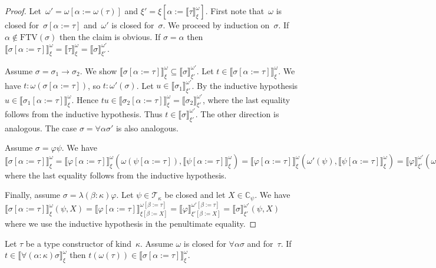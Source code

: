 \documentclass[a4paper,UKenglish,cleveref,autoref,numberwithinsect]{lipics-v2019}
\theoremstyle{definition}
\newcommand{\arrtype}{\rightarrow}
\newcommand{\subst}[2]{#1:=#2}
\newcommand{\FTV}{\mathrm{FTV}}
\newcommand{\Tc}{\mathcal{T}}
\newcommand{\Cb}{\mathbb{C}}
\newcommand{\val}[3]{\ensuremath{\llbracket#1\rrbracket_{#2}^{#3}}}
\begin{document}
\begin{proof}
  Let~$\omega' = \omega[\subst{\alpha}{\omega(\tau)}]$ and $\xi' =
  \xi[\subst{\alpha}{\val{\tau}{\xi}{\omega}}]$. First note
  that~$\omega$ is closed for~$\sigma[\subst{\alpha}{\tau}]$
  and~$\omega'$ is closed for~$\sigma$. We proceed by induction
  on~$\sigma$. If $\alpha \notin \FTV(\sigma)$ then the claim is
  obvious. If $\sigma = \alpha$ then
  $\val{\sigma[\subst{\alpha}{\tau}]}{\xi}{\omega} =
  \val{\tau}{\xi}{\omega} = \val{\sigma}{\xi'}{\omega'}$.

  Assume $\sigma = \sigma_1\arrtype\sigma_2$. We show
  $\val{\sigma[\subst{\alpha}{\tau}]}{\xi}{\omega} \subseteq
  \val{\sigma}{\xi'}{\omega'}$. Let $t \in
  \val{\sigma[\subst{\alpha}{\tau}]}{\xi}{\omega}$. We have $t :
  \omega(\sigma[\subst{\alpha}{\tau}])$, so $t : \omega'(\sigma)$. Let
  $u \in \val{\sigma_1}{\xi'}{\omega'}$. By the inductive hypothesis
  $u \in \val{\sigma_1[\subst{\alpha}{\tau}]}{\xi}{\omega}$. Hence $t
  u \in \val{\sigma_2[\subst{\alpha}{\tau}]}{\xi}{\omega} =
  \val{\sigma_2}{\xi'}{\omega'}$, where the last equality follows from
  the inductive hypothesis. Thus $t \in
  \val{\sigma}{\xi'}{\omega'}$. The other direction is analogous. The
  case $\sigma = \forall\alpha\sigma'$ is also analogous.

  Assume $\sigma = \varphi\psi$. We have
  $\val{\sigma[\subst{\alpha}{\tau}]}{\xi}{\omega} =
  \val{\varphi[\subst{\alpha}{\tau}]}{\xi}{\omega}(\omega(\psi[\subst{\alpha}{\tau}]),
  \val{\psi[\subst{\alpha}{\tau}]}{\xi}{\omega}) =
  \val{\varphi[\subst{\alpha}{\tau}]}{\xi}{\omega}(\omega'(\psi),
  \val{\psi[\subst{\alpha}{\tau}]}{\xi}{\omega}) =
  \val{\varphi}{\xi'}{\omega'}(\omega'(\psi),
  \val{\psi}{\xi'}{\omega'})$ where the last equality follows from the
  inductive hypothesis.

  Finally, assume $\sigma = \lambda(\beta:\kappa)\varphi$. Let $\psi
  \in \Tc_\kappa$ be closed and let $X \in \Cb_\psi$. We have
  $\val{\sigma[\subst{\alpha}{\tau}]}{\xi}{\omega}(\psi,X) =
  \val{\varphi[\subst{\alpha}{\tau}]}{\xi[\subst{\beta}{X}]}{\omega[\subst{\beta}{\tau}]}
  =
  \val{\varphi}{\xi'[\subst{\beta}{X}]}{\omega'[\subst{\beta}{\tau}]}
  = \val{\sigma}{\xi'}{\omega'}(\psi,X)$ where we use the inductive
  hypothesis in the penultimate equality.
\end{proof}

\begin{lemma}\label{lem_forall}
  Let $\tau$ be a type constructor of kind~$\kappa$. Assume $\omega$
  is closed for $\forall\alpha\sigma$ and for~$\tau$. If $t \in
  \val{\forall(\alpha:\kappa)\sigma}{\xi}{\omega}$ then $t
  (\omega(\tau)) \in \val{\sigma[\subst{\alpha}{\tau}]}{\xi}{\omega}$.
\end{lemma}
\end{document}
